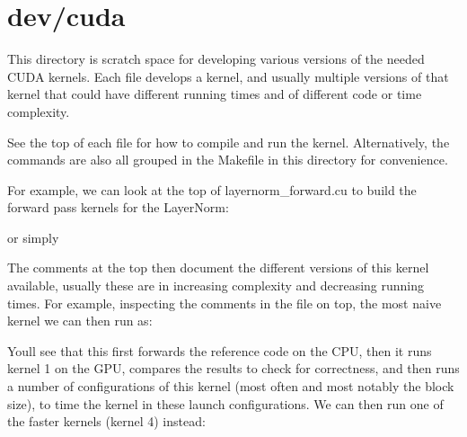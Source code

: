 \chapter{dev/cuda}
\hypertarget{md_dev_2cuda_2README}{}\label{md_dev_2cuda_2README}
\label{md_dev_2cuda_2README_autotoc_md39}%
%


This directory is scratch space for developing various versions of the needed CUDA kernels. Each file develops a kernel, and usually multiple versions of that kernel that could have different running times and of different code or time complexity.

See the top of each file for how to compile and run the kernel. Alternatively, the commands are also all grouped in the {\ttfamily Makefile} in this directory for convenience.

For example, we can look at the top of {\ttfamily layernorm\+\_\+forward.\+cu} to build the forward pass kernels for the Layer\+Norm\+:


\begin{DoxyCode}{0}

\end{DoxyCode}


or simply


\begin{DoxyCode}{0}

\end{DoxyCode}


The comments at the top then document the different versions of this kernel available, usually these are in increasing complexity and decreasing running times. For example, inspecting the comments in the file on top, the most naive kernel we can then run as\+:


\begin{DoxyCode}{0}

\end{DoxyCode}


You\textquotesingle{}ll see that this first forwards the reference code on the CPU, then it runs kernel 1 on the GPU, compares the results to check for correctness, and then runs a number of configurations of this kernel (most often and most notably the block size), to time the kernel in these launch configurations. We can then run one of the faster kernels (kernel 4) instead\+:


